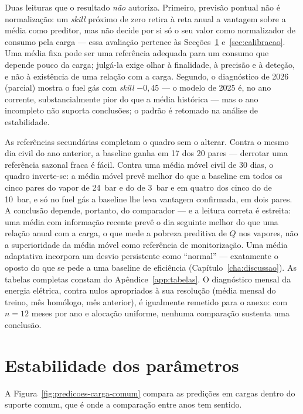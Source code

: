 Duas leituras que o resultado \emph{não} autoriza. Primeiro, previsão pontual
não é normalização: um \emph{skill} próximo de zero retira à reta anual a
vantagem sobre a média como preditor, mas não decide por si só o seu valor
como normalizador de consumo pela carga --- essa avaliação pertence às
Secções~\ref{sec:estabilidade} e~\ref{sec:calibracao}. Uma média fixa pode
ser uma referência adequada para um consumo que depende pouco da carga;
julgá-la exige olhar à finalidade, à precisão e à deteção, e não à
existência de uma relação com a carga. Segundo, o diagnóstico de 2026 (parcial) mostra o
fuel gás com \emph{skill} $-0{,}45$ --- o modelo de 2025 é, no ano corrente,
substancialmente pior do que a média histórica --- mas o ano incompleto não
suporta conclusões; o padrão é retomado na análise de estabilidade.

As referências secundárias completam o quadro sem o alterar. Contra o mesmo
dia civil do ano anterior, a baseline ganha em 17 dos 20 pares --- derrotar
uma referência sazonal fraca é fácil. Contra uma média móvel civil de 30
dias, o quadro inverte-se: a média móvel prevê melhor do que a baseline em
todos os cinco pares do vapor de 24~bar e do de 3~bar e em quatro dos cinco
do de 10~bar, e só no fuel gás a baseline lhe leva vantagem confirmada, em
dois pares. A conclusão depende, portanto, do comparador --- e a leitura
correta é estreita: uma média com informação recente prevê o dia seguinte
melhor do que uma relação anual com a carga, o que mede a pobreza preditiva
de $Q$ nos vapores, não a superioridade da média móvel como referência de
monitorização. Uma média adaptativa incorpora um desvio persistente como
``normal'' --- exatamente o oposto do que se pede a uma baseline de eficiência
(Capítulo~\ref{cha:discussao}). As tabelas completas constam do
Apêndice~\ref{app:tabelas}. O diagnóstico mensal da energia elétrica, contra
nulos apropriados à sua resolução (média mensal do treino, mês homólogo, mês
anterior), é igualmente remetido para o anexo: com $n{=}12$ meses por ano e
alocação uniforme, nenhuma comparação sustenta uma conclusão.

\section{Estabilidade dos parâmetros}
\label{sec:estabilidade}

A Figura~\ref{fig:predicoes-carga-comum} compara as predições em cargas dentro do suporte comum, que é onde a comparação entre anos tem sentido.

